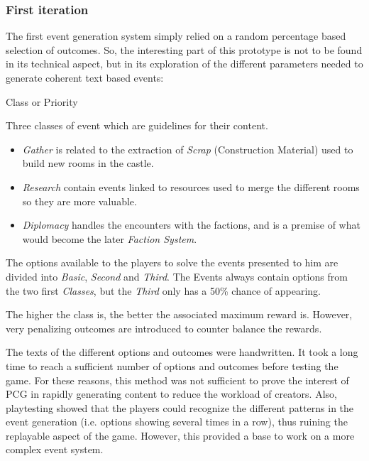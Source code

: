\subsubsection{First iteration}
The first event generation system simply relied on a random percentage based selection of outcomes. So, the interesting part of this prototype is not to be found in its technical aspect, but in its exploration of the different parameters needed to generate coherent text based events:
\begin{labeling}{Class or Priority}
\item[\textbf{Event Type}] Three classes of event which are guidelines for their content.
\begin{itemize}
\item \textit{Gather} is related to the extraction of \textit{Scrap} (Construction Material) used to build new rooms in the castle.
\item \textit{Research} contain events linked to resources  used to merge the different rooms so they are more valuable.
\item \textit{Diplomacy} handles the encounters with the factions, and is a premise of what would become the later \textit{Faction System}.
\end{itemize}
\item[\textbf{Option Class}] The options available to the players to solve the events presented to him are divided into \textit{Basic}, \textit{Second} and \textit{Third}. The Events always contain options from the two first \textit{Classes}, but the \textit{Third} only has a 50\% chance of appearing. 
\item[\textbf{Risk}] The higher the class is, the better the associated maximum reward is. However, very penalizing outcomes are introduced to counter balance the rewards.
\end{labeling}
The texts of the different options and outcomes were handwritten. It took a long time to reach a sufficient number of options and outcomes before testing the game. For these reasons, this method was not sufficient to prove the interest of PCG in rapidly generating content to reduce the workload of creators. Also, playtesting showed that the players could recognize the different patterns in the event generation (i.e. options showing several times in a row), thus ruining the replayable aspect of the game. However, this provided a base to work on a more complex event system.
